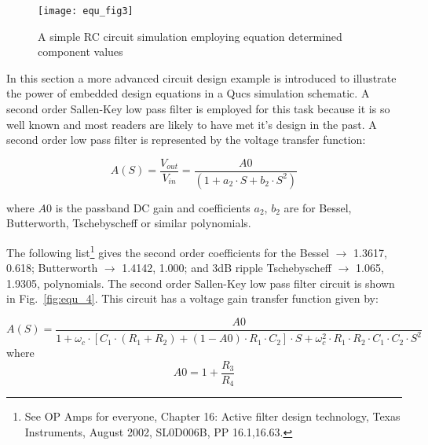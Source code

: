 \begin{figure}
  \centering
  \texttt{[image: equ\_fig3]}
  \caption{A simple RC circuit simulation employing equation determined component values}
  \label{fig:equ_3}
\end{figure} 


In this section a more advanced circuit design example is introduced
to illustrate the power of embedded design equations in a Qucs
simulation schematic. A second order Sallen-Key low pass filter is
employed for this task because it is so well known and most readers
are likely to have met it's design in the past.  A second order low
pass filter is represented by the voltage transfer function:

\vspace{3mm}
\begin{equation}
A(S)=\dfrac{V_{out}}{V_{in}}=\dfrac{A0}{\left(1+a_{2}\cdot S + b_{2}\cdot S^{2} \right) }
\end{equation}  

\vspace{3mm}

where $A0$ is the passband DC gain and coefficients $a_{2}$, $b_{2}$
are for Bessel, Butterworth, Tschebyscheff or similar polynomials.

\vspace{3mm}

The following list\footnote{See OP Amps for everyone, Chapter 16:
Active filter design technology, Texas Instruments, August 2002,
SL0D006B, PP 16.1,16.63.} gives the second order coefficients for the
Bessel $\rightarrow$ 1.3617, 0.618; Butterworth $\rightarrow$ 1.4142,
1.000; and 3dB ripple Tschebyscheff $\rightarrow$ 1.065, 1.9305,
polynomials. The second order Sallen-Key low pass filter circuit is
shown in Fig.~\ref{fig:equ_4}. This circuit has a voltage gain
transfer function given by:

\vspace{3mm}

\begin{equation}
A(S)=\dfrac{A0}{1+\omega_{c}\cdot\left[ C_{1}\cdot \left(R_{1}+R_{2}\right)+\left(1-A0\right)\cdot R_{1}\cdot C_{2}\right]\cdot S+\omega_{c}^{2}\cdot R_{1}\cdot R_{2}\cdot C_{1}\cdot C_{2}\cdot S^{2}}
\end{equation}
where
\begin{equation}
A0=1+\dfrac{R_{3}}{R_{4}} 
\end{equation} 

